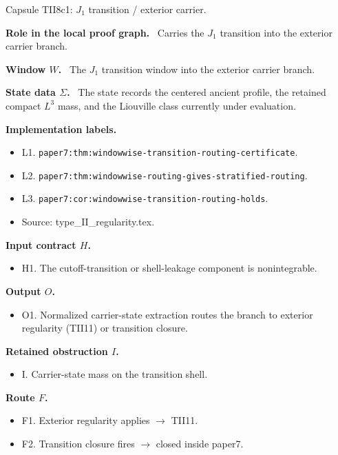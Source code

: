 \documentclass[11pt]{amsart}
\newcommand{\capsulefield}[1]{\par\smallskip\noindent\textbf{#1.}\ }
\begin{document}
\begin{proofcapsule}{Capsule TII8c1: $J_1$ transition / exterior carrier.}
  \capsulefield{Role in the local proof graph}
  Carries the \(J_1\) transition into the exterior carrier branch.

  \capsulefield{Window \(W\)}
The $J_1$ transition window into the exterior carrier branch.

  \capsulefield{State data \(\Sigma\)}
The state records the centered ancient profile, the retained compact $L^3$ mass, and the Liouville class currently under evaluation.

  \capsulefield{Implementation labels}
  \begin{itemize}[leftmargin=1.8em]
  \item L1. \texttt{paper7:thm:windowwise-transition-routing-certificate}.
  \item L2. \texttt{paper7:thm:windowwise-routing-gives-stratified-routing}.
  \item L3. \texttt{paper7:cor:windowwise-transition-routing-holds}.
  \item Source: type\_II\_regularity.tex.
  \end{itemize}

  \capsulefield{Input contract \(H\)}
  \begin{itemize}[leftmargin=1.8em]
  \item H1. The cutoff-transition or shell-leakage component is nonintegrable.
  \end{itemize}

  \capsulefield{Output \(O\)}
  \begin{itemize}[leftmargin=1.8em]
  \item O1. Normalized carrier-state extraction routes the branch to exterior regularity (TII11) or transition closure.
  \end{itemize}

  \capsulefield{Retained obstruction \(I\)}
  \begin{itemize}[leftmargin=1.8em]
  \item I. Carrier-state mass on the transition shell.
  \end{itemize}

  \capsulefield{Route \(F\)}
  \begin{itemize}[leftmargin=1.8em]
  \item F1. Exterior regularity applies $\to$ TII11.
  \item F2. Transition closure fires $\to$ closed inside paper7.
  \end{itemize}


\end{proofcapsule}
\end{document}

